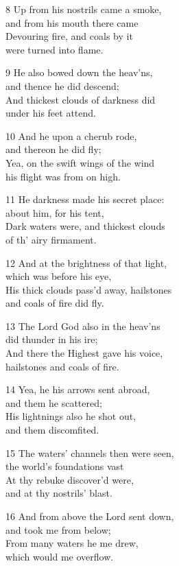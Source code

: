 \begin{multicols}{3}
8 Up from his nostrils came a smoke,\\
and from his mouth there came\\
Devouring fire, and coals by it\\
were turned into flame.

9 He also bowed down the heav’ns,\\
and thence he did descend;\\
And thickest clouds of darkness did\\
under his feet attend.

10 And he upon a cherub rode,\\
and thereon he did fly;\\
Yea, on the swift wings of the wind\\
his flight was from on high.

11 He darkness made his secret place:\\
about him, for his tent,\\
Dark waters were, and thickest clouds\\
of th’ airy firmament.

12 And at the brightness of that light,\\
which was before his eye,\\
His thick clouds pass’d away, hailstones\\
and coals of fire did fly.

13 The Lord God also in the heav’ns\\
did thunder in his ire;\\
And there the Highest gave his voice,\\
hailstones and coals of fire.

14 Yea, he his arrows sent abroad,\\
and them he scattered;\\
His lightnings also he shot out,\\
and them discomfited.

15 The waters’ channels then were seen,\\
the world’s foundations vast\\
At thy rebuke discover’d were,\\
and at thy nostrils’ blast.

16 And from above the Lord sent down,\\
and took me from below;\\
From many waters he me drew,\\
which would me overflow.


\end{multicols}
